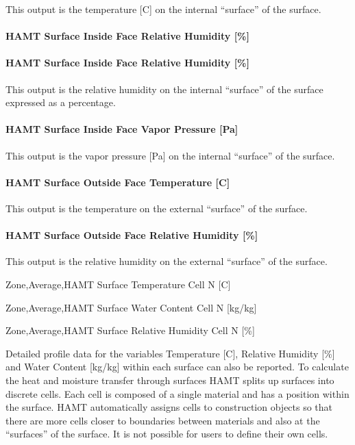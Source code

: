 This output is the temperature {[}C{]} on the internal ``surface'' of the surface.

\paragraph{HAMT Surface Inside Face Relative Humidity {[}\%{]}}\label{hamt-surface-inside-face-relative-humidity-2}

\paragraph{HAMT Surface Inside Face Relative Humidity {[}\%{]}}\label{hamt-surface-inside-face-relative-humidity-3}

This output is the relative humidity on the internal ``surface'' of the surface expressed as a percentage.

\paragraph{HAMT Surface Inside Face Vapor Pressure {[}Pa{]}}\label{hamt-surface-inside-face-vapor-pressure-pa-1}

This output is the vapor pressure {[}Pa{]} on the internal ``surface'' of the surface.

\paragraph{HAMT Surface Outside Face Temperature {[}C{]}}\label{hamt-surface-outside-face-temperature-c-1}

This output is the temperature on the external ``surface'' of the surface.

\paragraph{HAMT Surface Outside Face Relative Humidity {[}\%{]}}\label{hamt-surface-outside-face-relative-humidity-1}

This output is the relative humidity on the external ``surface'' of the surface.

Zone,Average,HAMT Surface Temperature Cell N {[}C{]}

Zone,Average,HAMT Surface Water Content Cell N {[}kg/kg{]}

Zone,Average,HAMT Surface Relative Humidity Cell N {[}\%{]}

Detailed profile data for the variables Temperature {[}C{]}, Relative Humidity {[}\%{]} and Water Content {[}kg/kg{]} within each surface can also be reported. To calculate the heat and moisture transfer through surfaces HAMT splits up surfaces into discrete cells. Each cell is composed of a single material and has a position within the surface. HAMT automatically assigns cells to construction objects so that there are more cells closer to boundaries between materials and also at the ``surfaces'' of the surface. It is not possible for users to define their own cells.

